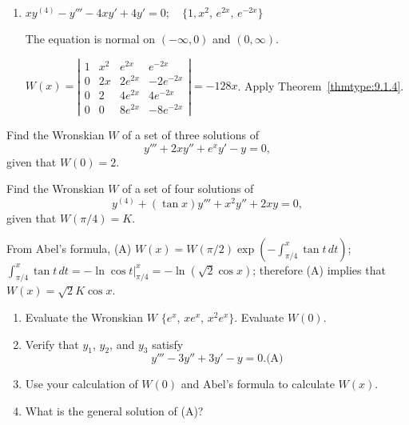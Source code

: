 \documentclass{ximera}
\begin{document}
\begin{problem}
\begin{enumerate}
\item $xy^{(4)}-y'''-4xy'+4y'=0;  \quad\{1,x^2,\,e^{2x},\,e^{-2x}\}$

\begin{solution}
The equation is normal on $(-\infty,0)$ and $(0,\infty)$.

$W(x)=
\left|\begin{array}{cccc}1&x^2&e^{2x}&e^{-2x}\\
0&2x&2e^{2x}&-2e^{-2x}\\0&2&4e^{2x}&4
e^{-2x}\\0&0&8e^{2x}&-8e^{-2x}\end{array}\right|
=-128x$. Apply Theorem~\ref{thmtype:9.1.4}.
\end{solution}
\end{enumerate}
\end{problem}

\begin{problem}\label{exer:9.1.7}Find the Wronskian $W$ of a set of three solutions of 
$$ y'''+2xy''+e^xy'-y=0, $$ given that $W(0)=2$.
\end{problem}

\begin{problem}\label{exer:9.1.8}
Find the Wronskian $W$ of a set of four solutions of
$$
y^{(4)}+(\tan x)y'''+x^2y''+2xy=0,
$$
given that $W(\pi/4)=K$.

\begin{solution}
From Abel's formula, (A) $W(x)=
W(\pi/2)\exp\left(-\int_{\pi/4}^x\tan t\,dt\right)$;
$\int_{\pi/4}^x \tan t\,dt=-\ln \cos
t\bigg|_{\pi/4}^x=-\ln(\sqrt2\cos x)$; therefore (A) implies that
$W(x)=\sqrt2K\cos x$.
\end{solution}
\end{problem}

\begin{problem}\label{exer:9.1.9}
\begin{enumerate}
\item %
Evaluate the Wronskian $W$ $\{e^x,\,xe^x,\,
x^2e^x\}$. Evaluate $W(0)$.

\item %
Verify that $y_1$, $y_2$, and $y_3$ satisfy
$$
y'''-3y''+3y'-y=0.
\text{(A)}
$$

\item %
Use your calculation of $W(0)$ and Abel's formula to calculate $W(x)$.

\item %
What is the general solution of  (A)?
\end{enumerate}
\end{problem}
\end{document}
